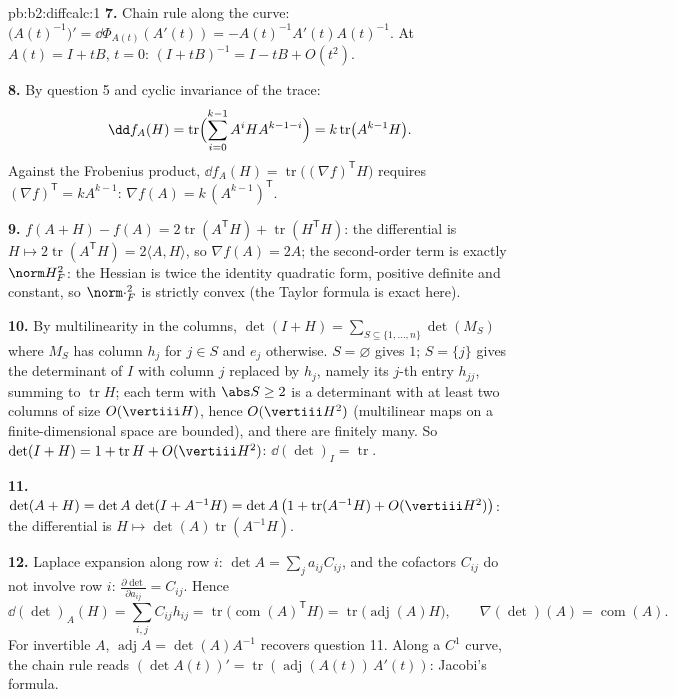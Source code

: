 \begin{solution}{pb:b2:diffcalc:1}
\textbf{7.} Chain rule along the curve:
$\bigl(A(t)^{-1}\bigr)' = \dd\Phi_{A(t)}(A'(t)) =
-A(t)^{-1}A'(t)A(t)^{-1}$. At $A(t) = I + tB$, $t = 0$: $(I +
tB)^{-1} = I - tB + O(t^2)$.

\textbf{8.} By question 5 and cyclic invariance of the trace:
\[
\dd f_A(H) = \operatorname{tr}\Bigl(\sum_{i=0}^{k-1}
A^iHA^{k-1-i}\Bigr) = k\operatorname{tr}\bigl(A^{k-1}H\bigr) .
\]
Against the Frobenius product, $\dd f_A(H) =
\operatorname{tr}\bigl((\nabla f)^{\mathsf T}H\bigr)$ requires
$(\nabla f)^{\mathsf T} = kA^{k-1}$: $\nabla f(A) =
k\,(A^{k-1})^{\mathsf T}$.

\textbf{9.} $f(A + H) - f(A) = 2\operatorname{tr}
(A^{\mathsf T}H) + \operatorname{tr}(H^{\mathsf T}H)$: the
differential is $H \mapsto 2\operatorname{tr}(A^{\mathsf T}H) =
2\langle A, H\rangle$, so $\nabla f(A) = 2A$; the second-order
term is exactly $\norm H_F^2$: the Hessian is twice the
identity quadratic form, positive definite and constant, so
$\norm\cdot_F^2$ is strictly convex (the Taylor formula is
exact here).

\textbf{10.} By multilinearity in the columns, $\det(I + H) =
\sum_{S\subseteq\{1,\dots,n\}}\det(M_S)$ where $M_S$ has column
$h_j$ for $j \in S$ and $e_j$ otherwise. $S = \varnothing$
gives $1$; $S = \{j\}$ gives the determinant of $I$ with column
$j$ replaced by $h_j$, namely its $j$-th entry $h_{jj}$,
summing to $\operatorname{tr}H$; each term with $\abs S \geq 2$
is a determinant with at least two columns of size
$O(\vertiii H)$, hence $O(\vertiii H^2)$ (multilinear maps on a
finite-dimensional space are bounded), and there are finitely
many. So $\det(I + H) = 1 + \operatorname{tr}H +
O(\vertiii H^2)$: $\dd(\det)_I = \operatorname{tr}$.

\textbf{11.} $\det(A + H) = \det A\,\det(I + A^{-1}H) =
\det A\,\bigl(1 + \operatorname{tr}(A^{-1}H) +
O(\vertiii H^2)\bigr)$: the differential is $H \mapsto
\det(A)\operatorname{tr}(A^{-1}H)$.

\textbf{12.} Laplace expansion along row $i$: $\det A =
\sum_j a_{ij}C_{ij}$, and the cofactors $C_{ij}$ do not involve
row $i$: $\frac{\partial\det}{\partial a_{ij}} = C_{ij}$. Hence
\[
\dd(\det)_A(H) = \sum_{i,j}C_{ij}h_{ij}
= \operatorname{tr}\bigl(\operatorname{com}(A)^{\mathsf T}
H\bigr)
= \operatorname{tr}\bigl(\operatorname{adj}(A)H\bigr),
\qquad
\nabla(\det)(A) = \operatorname{com}(A) .
\]
For invertible $A$, $\operatorname{adj}A = \det(A)A^{-1}$
recovers question 11. Along a $C^1$ curve, the chain rule reads
$(\det A(t))' = \operatorname{tr}(\operatorname{adj}
(A(t))\,A'(t))$: Jacobi's formula.


\end{solution}
